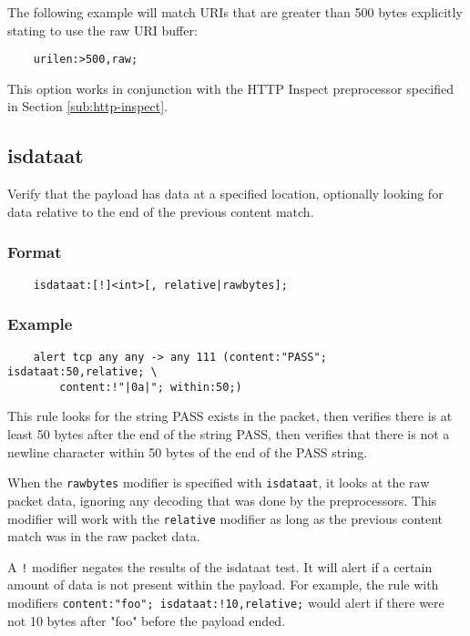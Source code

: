 \documentclass[english]{report}
\begin{document}
The following example will match URIs that are greater than 500 bytes explicitly
stating to use the raw URI buffer:

\begin{verbatim}
    urilen:>500,raw;
\end{verbatim}

This option works in conjunction with the HTTP Inspect preprocessor specified
in Section \ref{sub:http-inspect}.

\subsection{isdataat}

Verify that the payload has data at a specified location, optionally looking
for data relative to the end of the previous content match.

\subsubsection{Format}

\begin{verbatim}
    isdataat:[!]<int>[, relative|rawbytes];
\end{verbatim}

\subsubsection{Example}

\begin{verbatim}
    alert tcp any any -> any 111 (content:"PASS"; isdataat:50,relative; \ 
        content:!"|0a|"; within:50;)
\end{verbatim}

This rule looks for the string PASS exists in the packet, then verifies there
is at least 50 bytes after the end of the string PASS, then verifies that there
is not a newline character within 50 bytes of the end of the PASS string.

When the \texttt{rawbytes} modifier is specified with \texttt{isdataat}, it 
looks at the raw packet data, ignoring any decoding that was done by the 
preprocessors. This modifier will work with the \texttt{relative} modifier 
as long as the previous content match was in the raw packet data.

A \texttt{!} modifier negates the results of the isdataat test. It will alert 
if a certain amount of data is not present within the payload. For example,
the rule with modifiers \texttt{content:"foo"; isdataat:!10,relative;}  would 
alert if there were not 10 bytes after "foo" before the payload ended. 
\end{document}
